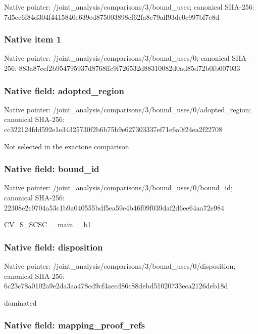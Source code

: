 \documentclass[10pt,a4paper]{article}
\begin{document}
Native pointer: /joint\_analysis/comparis\allowbreak{}ons/3/bound\_uses; canonical SHA-256: 7d5ec6f84d304f4415840e63\allowbreak{}9ed875003898cf62fa8e79af\allowbreak{}f93de0c997bf7e8d



\subsubsection{Native item 1}


Native pointer: /joint\_analysis/comparis\allowbreak{}ons/3/bound\_uses/0; canonical SHA-256: 883a87cef2b954795937d876\allowbreak{}8ffc9f726532d88310082d0a\allowbreak{}d85d72b0fb007033



\subsubsection{Native field: adopted\_region}


Native pointer: /joint\_analysis/comparis\allowbreak{}ons/3/bound\_uses/0/adopt\allowbreak{}ed\_region; canonical SHA-256: cc322124fdd592e1e3432573\allowbreak{}0f2b6b75b9e627303337ef71\allowbreak{}e6a0f24ea2f22708


Not selected in the exactone comparison.


\subsubsection{Native field: bound\_id}


Native pointer: /joint\_analysis/comparis\allowbreak{}ons/3/bound\_uses/0/bound\allowbreak{}\_id; canonical SHA-256: 22308e2c9704a53c1b9a0405\allowbreak{}55bdf5ea59e4b46f09f039da\allowbreak{}f2d6ee64aa72e984


CV\_S\_SCSC\_\_main\_\_b1


\subsubsection{Native field: disposition}


Native pointer: /joint\_analysis/comparis\allowbreak{}ons/3/bound\_uses/0/dispo\allowbreak{}sition; canonical SHA-256: 6c23c78a0102a9e2da3aa478\allowbreak{}cd9cf4aecd86c88debd51020\allowbreak{}733eca2126deb18d


dominated


\subsubsection{Native field: mapping\_proof\_refs}
\end{document}
